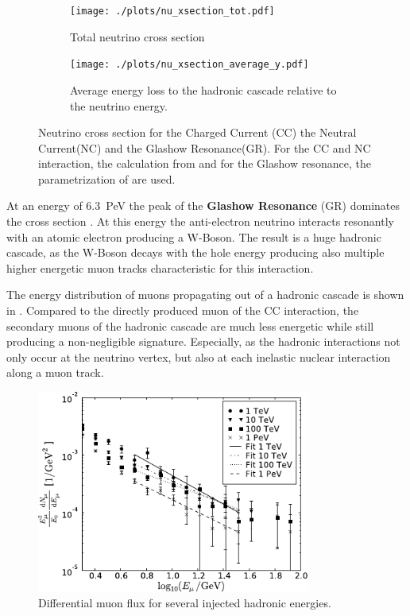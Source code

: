 \begin{figure}
    \centering
    \begin{subfigure}[t]{0.47\textwidth}
        \centering
        \texttt{[image: ./plots/nu\_xsection\_tot.pdf]}
        \caption{Total neutrino cross section}
        \label{fig:nu_xsection_tot}
    \end{subfigure}
    \hfill
    \begin{subfigure}[t]{0.47\textwidth}
        \centering
        \texttt{[image: ./plots/nu\_xsection\_average\_y.pdf]}
        \caption{Average energy loss to the hadronic cascade relative to the neutrino energy.}
        \label{fig:nu_xsection_y}
    \end{subfigure}
    \caption{Neutrino cross section for the Charged Current (CC) the Neutral Current(NC) and the Glashow Resonance(GR). For the CC and NC interaction, the calculation from \cite{CSMS11NuXsection} and for the Glashow resonance, the parametrization of \cite{Barger14} are used.}
    \label{fig:nu_xsection}
\end{figure}

At an energy of \SI{6.3}{PeV} the peak of the \textbf{Glashow Resonance} (GR) dominates the cross section \cite{Glashow60}.
At this energy the anti-electron neutrino interacts resonantly with an atomic electron producing a W-Boson.
The result is a huge hadronic cascade, as the W-Boson decays with the hole energy producing also multiple higher energetic muon tracks characteristic for this interaction.

The energy distribution of muons propagating out of a hadronic cascade is shown in .
Compared to the directly produced muon of the CC interaction, the secondary muons of the hadronic cascade are much less energetic while still producing a non-negligible signature.
Especially, as the hadronic interactions not only occur at the neutrino vertex, but also at each inelastic nuclear interaction along a muon track.
\begin{figure}
    \centering
    \includegraphics[width=0.8\textwidth]{./images/muon_flux_hadronic_shower.pdf}
    \caption{Differential muon flux for several injected hadronic energies. \cite{Panknin09ICRC}}
    \label{fig:mu_flux_hadr_shower}
\end{figure}
